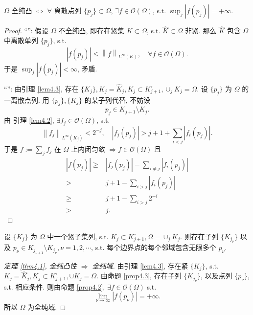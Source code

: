 \begin{proposition}\label{prop4.2}
    $\Omega $ 全纯凸 $\iff $ $\forall $ 离散点列 $\{p_j\} \subset \Omega $, $\exists f \in \mathcal{O}(\Omega )$, s.t. $\sup_j \left| f(p_j) \right| =+\infty  $.      
\end{proposition}
\begin{proof}
    ``\Leftarrow '': 假设 $\Omega $ 不全纯凸,  即存在紧集 $K \subset \Omega $, s.t. $\hat{K} \subset \Omega $ 非紧.    
    那么 $\hat{K}$ 包含 $\Omega $ 中离散单列 $\{p_j\}$, s.t. 
    $$ \left| f(p_j) \right| \leq \left\| f \right\| _{L^{\infty }(K)}, \quad \forall f \in \mathcal{O}(\Omega ) .$$
    于是 $\sup_j |f(p_j)| <\infty $, 矛盾.
    
    ``\Rightarrow '':  由引理 \ref{lem4.3}, 存在 $\{K_j\}, K_j =\hat{K}_j, K_j \subset K_{j+1}^{\circ }, \cup _j K_j =\Omega $. 
    设 $\{p_j\}$ 为 $\Omega $ 的一离散点列. 
    用 $\{p_j\},\{K_j\}$ 的某子列代替, 不妨设 
    $$ p_j \in K_{j+1} \setminus K_j. $$  
    由 引理 \ref{lem4.2}, $\exists f_j \in \mathcal{O}(\Omega )$, s.t. 
    $$ \left\| f_j \right\|_{L^{\infty }(K_j)} <2^{-j}, \quad \left| f_j(p_j) \right| >j+1 +\sum_{i<j} \left| f_i(p_j) \right| .  $$   
    于是 $f:=\sum_{j}^{}f_j$  在 $\Omega $  上内闭匀敛 $\Rightarrow f \in \mathcal{O}(\Omega )$ 且 
    \[ \begin{aligned}
        |f(p_j)| \geq& |f_j(p_j)|-\sum_{i \neq j} \left| f_i(p_j) \right| \\
        >&j+1-\sum_{i>j}^{} |f_i(p_j)|\\
        \geq& j+1- \sum_{i >j}^{} 2^{-i}\\
        >&j.
    \end{aligned}  \]    
\end{proof}

\begin{proposition}\label{prop4.3}
    设 $\{K_j\}$ 为 $\Omega $ 中一个紧子集列, s.t. $K_j \subset K_{j+1}^{\circ }, \Omega = \cup_j K_j$.  则存在子列 $\{K_{j_{\nu }}\}$ 以及 $p_{\nu } \in K_{j_{\nu +1}} \setminus K_{j_{\nu }}, \nu =1,2,\cdots $, s.t. 每个边界点的每个邻域包含无限多个 $p_{\nu }$.   
\end{proposition}

\begin{proof}[定理 \ref{thm4.1}, 全纯凸性 $\Rightarrow $ 全纯域]
    由引理 \ref{lem4.3}, 存在紧 $\{K_j\}$, s.t. $K_j=\hat{K}_j, K_j \subset K_{j+1}^{\circ }, \cup K_j =\Omega $.  由命题 \ref{prop4.3}, 存在子列 $\{K_{j_{\nu }}\}$, 以及点列 $\{p_{\nu }\}$, s.t. 相应条件. 则由命题 \ref{prop4.2}, $\exists f \in \mathcal{O}(\Omega )$ s.t. 
    $$ \lim_{\nu \to \infty } |f(p_{\nu })|=+\infty .$$
    所以 $\Omega $ 为全纯域.     
\end{proof}

